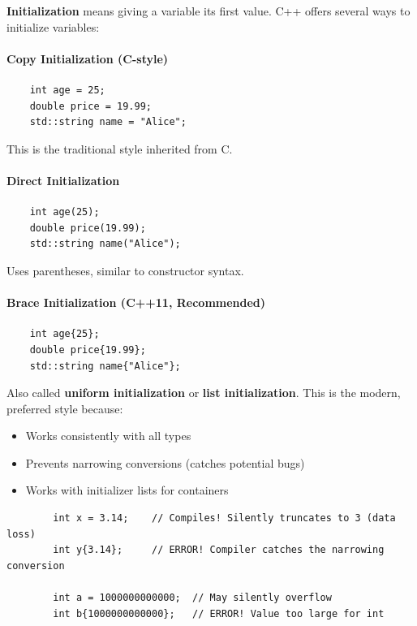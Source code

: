 \textbf{Initialization} means giving a variable its first value. C++ offers several ways to initialize variables:

\paragraph{Copy Initialization (C-style)}

\begin{lstlisting}
	int age = 25;
	double price = 19.99;
	std::string name = "Alice";
\end{lstlisting}

This is the traditional style inherited from C.

\paragraph{Direct Initialization}

\begin{lstlisting}
	int age(25);
	double price(19.99);
	std::string name("Alice");
\end{lstlisting}

Uses parentheses, similar to constructor syntax.

\paragraph{Brace Initialization (C++11, Recommended)}

\begin{lstlisting}
	int age{25};
	double price{19.99};
	std::string name{"Alice"};
\end{lstlisting}

Also called \textbf{uniform initialization} or \textbf{list initialization}. This is the modern, preferred style because:
\begin{itemize}
	\item Works consistently with all types
	\item Prevents narrowing conversions (catches potential bugs)
	\item Works with initializer lists for containers
\end{itemize}

\begin{example}{\leavevmode}
	
	\begin{lstlisting}
		int x = 3.14;    // Compiles! Silently truncates to 3 (data loss)
		int y{3.14};     // ERROR! Compiler catches the narrowing conversion
		
		int a = 1000000000000;  // May silently overflow
		int b{1000000000000};   // ERROR! Value too large for int
	\end{lstlisting}
\end{example}

